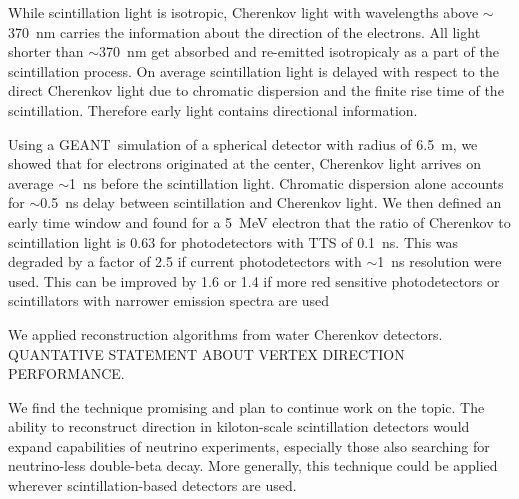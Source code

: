 \documentclass[cits]{JINST}
\begin{document}
While scintillation light is isotropic, Cherenkov light with wavelengths above $\sim$370~nm carries the information about the direction of the electrons. All light shorter than $\sim$370~nm get absorbed and re-emitted isotropicaly as a part of the scintillation process. On average scintillation light is delayed with respect to the direct Cherenkov light due to chromatic dispersion and the finite rise time of the scintillation. Therefore early light contains directional information.

Using a GEANT~simulation of a spherical detector with radius of 6.5~m, we showed that for electrons originated at the center, Cherenkov light arrives on average $\sim$1~ns before the scintillation light. Chromatic dispersion alone accounts for $\sim$0.5~ns delay between scintillation and Cherenkov light. We then defined an early time window and found for a 5~MeV electron that the ratio of Cherenkov to scintillation light is 0.63 for photodetectors with TTS of 0.1~ns. This was degraded by a factor of 2.5 if current photodetectors with $\sim$1~ns resolution were used. This can be improved by 1.6 or 1.4  if more red sensitive photodetectors or scintillators with narrower emission spectra are used

We applied reconstruction algorithms from water Cherenkov detectors. QUANTATIVE STATEMENT ABOUT VERTEX DIRECTION PERFORMANCE.

We find the technique promising and plan to continue work on the topic. The ability to reconstruct direction in kiloton-scale scintillation detectors would expand capabilities of neutrino experiments, especially those also searching for neutrino-less double-beta decay. More generally, this technique could be applied wherever scintillation-based detectors are used.



\end{document}
